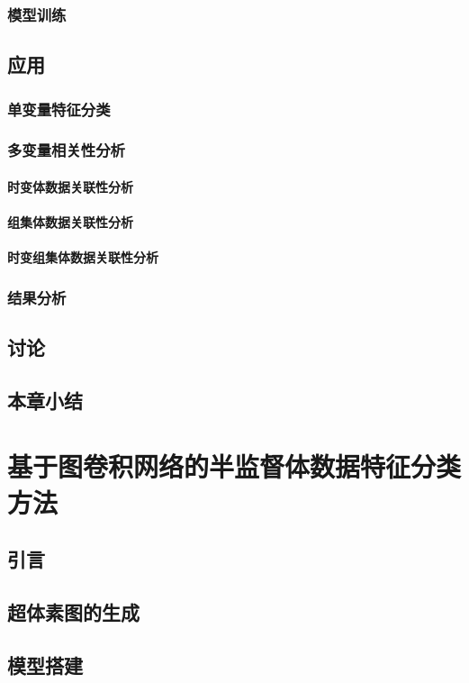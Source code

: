 \subsection{模型训练}
\section{应用}
\subsection{单变量特征分类}
\subsection{多变量相关性分析}
\subsubsection{时变体数据关联性分析}
\subsubsection{组集体数据关联性分析}
\subsubsection{时变组集体数据关联性分析}
\subsection{结果分析}
\section{讨论}
\section{本章小结}

\chapter{基于图卷积网络的半监督体数据特征分类方法}
\section{引言}
\section{超体素图的生成}
\section{模型搭建}
